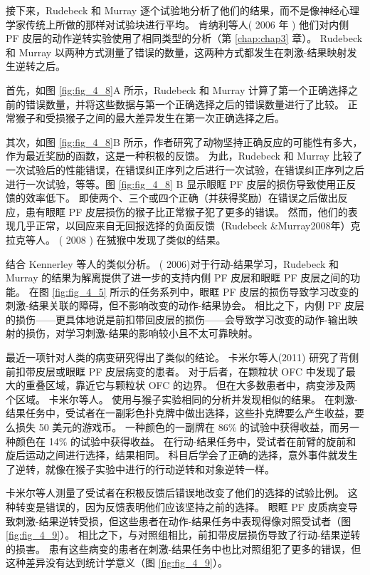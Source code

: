 接下来，Rudebeck 和 Murray 逐个试验地分析了他们的结果，而不是像神经心理学家传统上所做的那样对试验块进行平均。
肯纳利等人( 2006 年 ) 他们对内侧 PF 皮层的动作逆转实验使用了相同类型的分析（第 \ref{chap:chap3} 章）。 Rudebeck 和 Murray 以两种方式测量了错误的数量，这两种方式都发生在刺激-结果映射发生逆转之后。\par
首先，如图 \ref{fig:fig_4_8}A 所示，Rudebeck 和 Murray 计算了第一个正确选择之前的错误数量，并将这些数据与第一个正确选择之后的错误数量进行了比较。 正常猴子和受损猴子之间的最大差异发生在第一次正确选择之后。\par
其次，如图 \ref{fig:fig_4_8}B 所示，作者研究了动物坚持正确反应的可能性有多大，作为最近奖励的函数，这是一种积极的反馈。 为此，Rudebeck 和 Murray 比较了一次试验后的性能错误，在错误纠正序列之后进行一次试验，在错误纠正序列之后进行一次试验，等等。图 \ref{fig:fig_4_8} B 显示眼眶 PF 皮层的损伤导致使用正反馈的效率低下。 即使两个、三个或四个正确（并获得奖励）在错误之后做出反应，患有眼眶 PF 皮层损伤的猴子比正常猴子犯了更多的错误。 然而，他们的表现几乎正常，以回应来自无回报选择的负面反馈（Rudebeck \&Murray2008年）克拉克等人。 ( 2008 ) 在狨猴中发现了类似的结果。\par
结合 Kennerley 等人的类似分析。 ( 2006)对于行动-结果学习，Rudebeck 和 Murray 的结果为解离提供了进一步的支持内侧 PF 皮层和眼眶 PF 皮层之间的功能。 在图 \ref{fig:fig_4_5} 所示的任务系列中，眼眶 PF 皮层的损伤导致学习改变的刺激-结果关联的障碍，但不影响改变的动作-结果协会。 相比之下，内侧 PF 皮层的损伤——更具体地说是前扣带回皮层的损伤——会导致学习改变的动作-输出映射的损伤，对学习刺激-结果的影响较小且不太可靠映射。\par
最近一项针对人类的病变研究得出了类似的结论。 卡米尔等人(2011) 研究了背侧前扣带皮层或眼眶 PF 皮层病变的患者。 对于后者，在颗粒状 OFC 中发现了最大的重叠区域，靠近它与颗粒状 OFC 的边界。 但在大多数患者中，病变涉及两个区域。 卡米尔等人。 使用与猴子实验相同的分析并发现相似的结果。 在刺激-结果任务中，受试者在一副彩色扑克牌中做出选择，这些扑克牌要么产生收益，要么损失 50 美元的游戏币。 一种颜色的一副牌在 86\% 的试验中获得收益，而另一种颜色在 14\% 的试验中获得收益。 在行动-结果任务中，受试者在前臂的旋前和旋后运动之间进行选择，结果相同。 科目后学会了正确的选择，意外事件就发生了逆转，就像在猴子实验中进行的行动逆转和对象逆转一样。\par
卡米尔等人测量了受试者在积极反馈后错误地改变了他们的选择的试验比例。 这种转变是错误的，因为反馈表明他们应该坚持之前的选择。 眼眶 PF 皮质病变导致刺激-结果逆转受损，但这些患者在动作-结果任务中表现得像对照受试者（图 \ref{fig:fig_4_9}）。 相比之下，与对照组相比，前扣带皮层损伤导致了行动-结果逆转的损害。 患有这些病变的患者在刺激-结果任务中也比对照组犯了更多的错误，但这种差异没有达到统计学意义（图 \ref{fig:fig_4_9}）。\par
